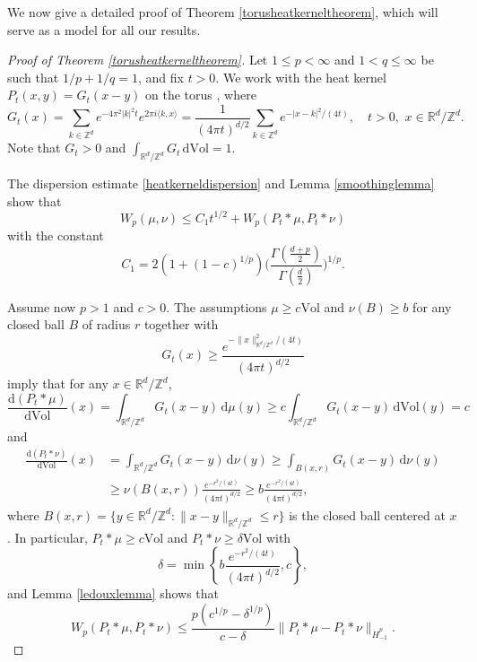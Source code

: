 \documentclass[11pt,a4paper]{article}
\theoremstyle{definition}
\begin{document}
We now give a detailed proof of Theorem \ref{torusheatkerneltheorem}, which will serve as a model for all our results.
\begin{proof}[Proof of Theorem \ref{torusheatkerneltheorem}] Let $1 \le p < \infty$ and $1<q \le \infty$ be such that $1/p+1/q=1$, and fix $t>0$. We work with the heat kernel $P_t(x,y)=G_t(x-y)$ on the torus \cite[Section 4.4.2]{GF}, where
\[ G_t (x) = \sum_{k \in \mathbb{Z}^d} e^{-4 \pi^2 |k|^2 t} e^{2 \pi i \langle k, x \rangle} = \frac{1}{(4 \pi t)^{d/2}} \sum_{k \in \mathbb{Z}^d} e^{-|x-k|^2/(4t)}, \quad t>0, \,\, x \in \mathbb{R}^d / \mathbb{Z}^d . \]
Note that $G_t>0$ and $\int_{\mathbb{R}^d / \mathbb{Z}^d} G_t \, \mathrm{d}\mathrm{Vol} =1$.

The dispersion estimate \eqref{heatkerneldispersion} and Lemma \ref{smoothinglemma} show that
\begin{equation}\label{torusheatkernelstep1}
W_p (\mu, \nu) \le C_1 t^{1/2} + W_p (P_t *\mu, P_t *\nu)
\end{equation}
with the constant
\[ C_1 = 2 (1+(1-c)^{1/p}) \Bigg( \frac{\Gamma \left( \frac{d+p}{2} \right)}{\Gamma \left( \frac{d}{2} \right)} \Bigg)^{1/p} . \]

Assume now $p>1$ and $c>0$. The assumptions $\mu \ge c \mathrm{Vol}$ and $\nu(B) \ge b$ for any closed ball $B$ of radius $r$ together with
\[ G_t (x) \ge \frac{e^{-\| x \|_{\mathbb{R}^d / \mathbb{Z}^d}^2/(4t)}}{(4 \pi t)^{d/2}} \]
imply that for any $x \in \mathbb{R}^d / \mathbb{Z}^d$,
\[ \frac{\mathrm{d}(P_t *\mu)}{\mathrm{d}\mathrm{Vol}}(x) = \int_{\mathbb{R}^d / \mathbb{Z}^d} G_t (x-y) \, \mathrm{d} \mu (y) \ge c  \int_{\mathbb{R}^d / \mathbb{Z}^d} G_t (x-y) \, \mathrm{d} \mathrm{Vol} (y) = c \]
and
\[ \begin{split} \frac{\mathrm{d}(P_t *\nu)}{\mathrm{d}\mathrm{Vol}}(x) &= \int_{\mathbb{R}^d / \mathbb{Z}^d} G_t (x-y) \, \mathrm{d} \nu (y) \ge \int_{B(x,r)} G_t (x-y) \, \mathrm{d}\nu (y) \\ &\ge \nu (B(x,r)) \frac{e^{-r^2 /(4t)}}{(4 \pi t)^{d/2}} \ge b \frac{e^{-r^2 /(4t)}}{(4 \pi t)^{d/2}}, \end{split} \]
where $B(x,r) = \{ y \in \mathbb{R}^d / \mathbb{Z}^d : \| x-y \|_{\mathbb{R}^d / \mathbb{Z}^d} \le r \}$ is the closed ball centered at $x$. In particular, $P_t *\mu \ge c \mathrm{Vol}$ and $P_t *\nu \ge \delta \mathrm{Vol}$ with
\[ \delta = \min \left\{ b \frac{e^{-r^2 /(4t)}}{(4 \pi t)^{d/2}}, c \right\} , \]
and Lemma \ref{ledouxlemma} shows that
\begin{equation}\label{torusheatkernelstep2}
W_p (P_t *\mu, P_t *\nu) \le \frac{p(c^{1/p} - \delta^{1/p})}{c-\delta} \| P_t *\mu - P_t *\nu \|_{\dot{H}_{-1}^p} .
\end{equation}


\end{proof}
\end{document}
